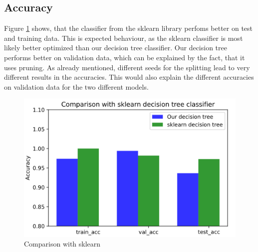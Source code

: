 \documentclass[12pt,a4paper]{scrartcl}		%
\begin{document}
\subsection{Accuracy}
Figure \ref{fig:acc} shows, that the classifier from the sklearn library perfoms better on test and training data.
This is expected behaviour, as the sklearn classifier is most likely better optimized than our decision tree classifier. 
Our decision tree performs better on validation data, which can be explained by the fact, that it uses pruning. 
As already mentioned, different seeds for the splitting lead to very different results in the accuracies. This would also 
explain the different accuracies on validation data for the two different models.
\begin{figure}[h]
    \centering
    \includegraphics[scale = 0.8]{sklearnacc.png}
    \caption{Comparison with sklearn}
    \label{fig:acc}
\end{figure}
\end{document}
